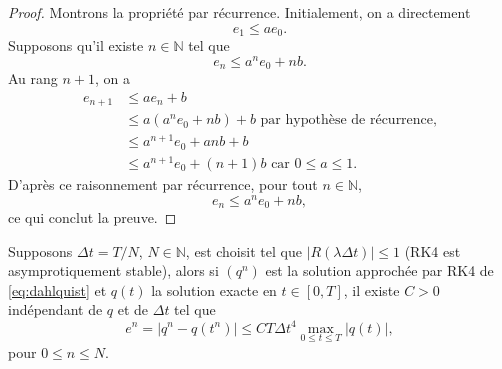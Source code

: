 \begin{proof}
Montrons la propriété par récurrence. Initialement, on a directement
\begin{equation}
e_1 \leq a e_0.
\end{equation}
Supposons qu'il existe $n \in \mathbb{N}$ tel que
\begin{equation}
e_n \leq a^n e_0 + nb.
\end{equation}
Au rang $n+1$, on a
\begin{align*}
e_{n+1} & \leq a e_n + b \\
	& \leq a \left( a^n e_0 + nb \right) + b \text{ par hypothèse de récurrence,}  \\
	& \leq a^{n+1} e_0 + anb + b\\
	& \leq a^{n+1} e_0 + (n+1)b \text{ car } 0 \leq a \leq 1.
\end{align*}
D'après ce raisonnement par récurrence, pour tout $n \in \mathbb{N}$,
\begin{equation}
e_n \leq a^n e_0 + nb,
\end{equation}
ce qui conclut la preuve.
\end{proof}

\begin{proposition}
Supposons $\Delta t = T/N$, $N \in \mathbb{N}$, est choisit tel que $|R(\lambda \Delta t ) | \leq 1$ (RK4 est asymprotiquement stable), alors si $(q^{n})$ est la solution approchée par RK4 de \eqref{eq:dahlquist} et $q(t)$ la solution exacte en $t \in [0,T]$, il existe $C>0$ indépendant de $q$ et de $\Delta t$ tel que
\begin{equation}
e^{n} = | q^{n} - q(t^{n}) | \leq C T \Delta t^4 \max_{0 \leq t \leq T} | q(t) |,
\end{equation}
pour $0 \leq n \leq N$.
\label{prop:consistance_rk4}
\end{proposition}

